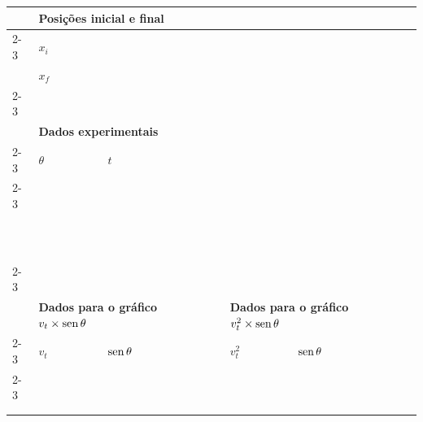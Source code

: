 \begin{table}[!h]
\centering
\begin{tabular}{lp{25mm}p{25mm}lp{25mm}p{25mm}l}
\toprule
	& \multicolumn{2}{l}{\textbf{Posições inicial e final}} \\
	\cmidrule{2-3}
	& $x_i$ \cellcolor[gray]{0.89} & \cellcolor[gray]{0.92} \\
	& $x_f$ \cellcolor[gray]{0.95} & \cellcolor[gray]{0.97} \\
	\cmidrule{2-3}
\\
	& \multicolumn{2}{l}{\textbf{Dados experimentais}} \\
	\cmidrule{2-3}
	& $\theta$ & $t$ & \\
	\cmidrule{2-3}
	& \cellcolor[gray]{0.89} & \cellcolor[gray]{0.92} \\
	& \cellcolor[gray]{0.95} & \cellcolor[gray]{0.97} \\
	& \cellcolor[gray]{0.89} & \cellcolor[gray]{0.92} \\
	& \cellcolor[gray]{0.95} & \cellcolor[gray]{0.97} \\
	& \cellcolor[gray]{0.89} & \cellcolor[gray]{0.92} \\
	& \cellcolor[gray]{0.95} & \cellcolor[gray]{0.97} \\
	& \cellcolor[gray]{0.89} & \cellcolor[gray]{0.92} \\
	& \cellcolor[gray]{0.95} & \cellcolor[gray]{0.97} \\
	& \cellcolor[gray]{0.89} & \cellcolor[gray]{0.92} \\
	& \cellcolor[gray]{0.95} & \cellcolor[gray]{0.97} \\
	& \cellcolor[gray]{0.89} & \cellcolor[gray]{0.92} \\
	& \cellcolor[gray]{0.95} & \cellcolor[gray]{0.97} \\
	\cmidrule{2-3}
\\
	& \multicolumn{2}{l}{\textbf{Dados para o gráfico $v_t \times \operatorname{sen}\theta$}} && \multicolumn{2}{l}{\textbf{Dados para o gráfico $v_t^2 \times \operatorname{sen}\theta$}} \\
	\cmidrule{2-3} \cmidrule{5-6}
	& $v_t$ & $\operatorname{sen}\theta$ & & $v_t^2$ & $\operatorname{sen}\theta$ &\\
	\cmidrule{2-3} \cmidrule{5-6}
	& \cellcolor[gray]{0.89} & \cellcolor[gray]{0.92} && \cellcolor[gray]{0.89} & \cellcolor[gray]{0.92} \\
	& \cellcolor[gray]{0.95} & \cellcolor[gray]{0.97} && \cellcolor[gray]{0.95} & \cellcolor[gray]{0.97} \\
	& \cellcolor[gray]{0.89} & \cellcolor[gray]{0.92} && \cellcolor[gray]{0.89} & \cellcolor[gray]{0.92} \\

\end{tabular}
\end{table}
